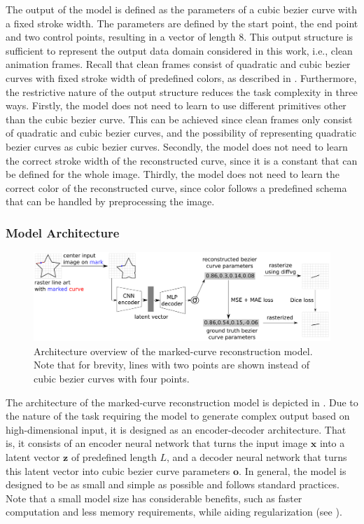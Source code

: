The output of the model is defined as the parameters of a cubic bezier curve with a fixed stroke width. The parameters are defined by the start point, the end point and two control points, resulting in a vector of length 8. This output structure is sufficient to represent the output data domain considered in this work, i.e., clean animation frames. Recall that clean frames consist of quadratic and cubic bezier curves with fixed stroke width of predefined colors, as described in . Furthermore, the restrictive nature of the output structure reduces the task complexity in three ways. Firstly, the model does not need to learn to use different primitives other than the cubic bezier curve. This can be achieved since clean frames only consist of quadratic and cubic bezier curves, and the possibility of representing quadratic bezier curves as cubic bezier curves. Secondly, the model does not need to learn the correct stroke width of the reconstructed curve, since it is a constant that can be defined for the whole image. Thirdly, the model does not need to learn the correct color of the reconstructed curve, since color follows a predefined schema that can be handled by preprocessing the image.

\subsubsection{Model Architecture}

\begin{figure}
    \centering
    \includegraphics[width=\textwidth]{graphics/mcrm.pdf}
    \caption{Architecture overview of the marked-curve reconstruction model. Note that for brevity, lines with two points are shown instead of cubic bezier curves with four points.}
    \label{fig:marked.model.arch}
\end{figure}

The architecture of the marked-curve reconstruction model is depicted in . Due to the nature of the task requiring the model to generate complex output based on high-dimensional input, it is designed as an encoder-decoder architecture. That is, it consists of an encoder neural network that turns the input image $\mathbf{x}$ into a latent vector $\mathbf{z}$ of predefined length $L$, and a decoder neural network that turns this latent vector into cubic bezier curve parameters $\mathbf{o}$. In general, the model is designed to be as small and simple as possible and follows standard practices. Note that a small model size has considerable benefits, such as faster computation and less memory requirements, while aiding regularization (see ).

